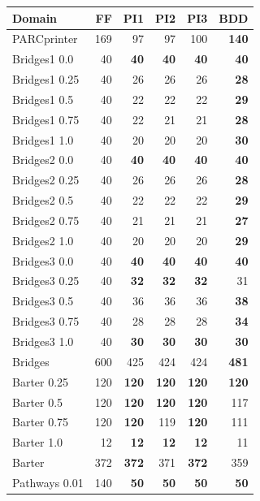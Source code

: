 \documentclass{article}
\begin{document}
\begin{table}																						
\begin{tabular}{|l|r|rrrr|}																						
\hline																						
Domain	&		FF		&		PI1		&		PI2		&		PI3		&		BDD		\\ \hline	\hline
PARCprinter 	&		169		&		97		&		97		&		100		&	{\bf	140}	\\	\hline\hline
Bridges1 0.0 	&		40		&	{\bf	40}	&	{\bf	40}	&	{\bf	40}	&	{\bf	40}	\\	
Bridges1 0.25 	&		40		&		26		&		26		&		26		&	{\bf	28}	\\	
Bridges1 0.5 	&		40		&		22		&		22		&		22		&	{\bf	29}	\\	
Bridges1 0.75 	&		40		&		22		&		21		&		21		&	{\bf	28}	\\	
Bridges1 1.0 	&		40		&		20		&		20		&		20		&	{\bf	30}	\\	
Bridges2 0.0 	&		40		&	{\bf	40}	&	{\bf	40}	&	{\bf	40}	&	{\bf	40}	\\	
Bridges2 0.25 	&		40		&		26		&		26		&		26		&	{\bf	28}	\\	
Bridges2 0.5 	&		40		&		22		&		22		&		22		&	{\bf	29}	\\	
Bridges2 0.75 	&		40		&		21		&		21		&		21		&	{\bf	27}	\\	
Bridges2 1.0 	&		40		&		20		&		20		&		20		&	{\bf	29}	\\	
Bridges3 0.0 	&		40		&	{\bf	40}	&	{\bf	40}	&	{\bf	40}	&	{\bf	40}	\\	
Bridges3 0.25 	&		40		&	{\bf	32}	&	{\bf	32}	&	{\bf	32}	&		31		\\	
Bridges3 0.5 	&		40		&		36		&		36		&		36		&	{\bf	38}	\\	
Bridges3 0.75 	&		40		&		28		&		28		&		28		&	{\bf	34}	\\	
Bridges3 1.0 	&		40		&	{\bf	30}	&	{\bf	30}	&	{\bf	30}	&	{\bf	30}	\\	\hline
Bridges 	&		600		&		425		&		424		&		424		&	{\bf	481}	\\	\hline\hline
Barter 0.25 	&		120		&	{\bf	120}	&	{\bf	120}	&	{\bf	120}	&	{\bf	120}	\\
Barter 0.5 	&		120		&	{\bf	120}	&	{\bf	120}	&	{\bf	120}	&		117		\\	
Barter 0.75 	&		120		&	{\bf	120}	&		119		&	{\bf	120}	&		111		\\	
Barter 1.0 	&		12		&	{\bf	12}	&	{\bf	12}	&	{\bf	12}	&		11		\\	\hline
Barter 	&		372		&	{\bf	372}	&		371		&	{\bf	372}	&		359		\\	\hline\hline
Pathways 0.01 	&		140		&	{\bf	50}	&	{\bf	50}	&	{\bf	50}	&	{\bf	50}	\\	

\end{tabular}
\end{table}
\end{document}
